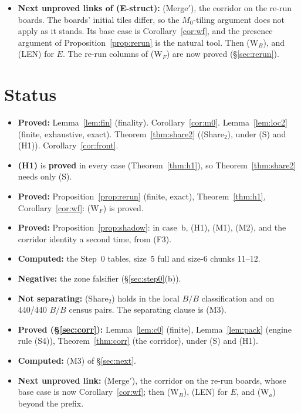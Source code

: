 \documentclass[11pt]{article}
\theoremstyle{definition}\newtheorem{definition}[theorem]{Definition}\newtheorem{remark}[theorem]{Remark}
\begin{document}
\begin{itemize}
(iii) $T_E=C$: for $E_0=(0,a0)$, with $(-1,0)$, and $E_0=(1,b)$, with $(-1,-1)$, the inequality $\le$ holds against every alternative. So nothing follows.
So (H1) in case~a remains open for $T_E=C$ and for $E_0=(0,a1)$.
\item \textbf{Next unproved links of (E-struct):} (Merge$'$), the corridor on the re-run boards. The boards' initial tiles differ, so the $M_0$-tiling argument does not apply as it stands. Its base case is Corollary~\ref{cor:wf}, and the presence argument of Proposition~\ref{prop:rerun} is the natural tool. Then (W$_B$), and (LEN) for $E$. The re-run columns of (W$_F$) are now proved (\S\ref{sec:rerun}).
\end{itemize}

\section*{Status}
\begin{itemize}
\item \textbf{Proved:} Lemma~\ref{lem:fin} (finality). Corollary~\ref{cor:m0}. Lemma~\ref{lem:loc2} (finite, exhaustive, exact). Theorem~\ref{thm:share2} ((Share$_2$), under (S) and (H1)). Corollary~\ref{cor:front}.
\item \textbf{(H1)} is \textbf{proved} in every case (Theorem~\ref{thm:h1}), so Theorem~\ref{thm:share2} needs only (S).
\item \textbf{Proved:} Proposition~\ref{prop:rerun} (finite, exact), Theorem~\ref{thm:h1}, Corollary~\ref{cor:wf}: (W$_F$) is proved.
\item \textbf{Proved:} Proposition~\ref{prop:shadow}: in case~b, (H1), (M1), (M2), and the corridor identity a second time, from (F3).
\item \textbf{Computed:} the Step~0 tables, size~5 full and size-6 chunks 11--12.
\item \textbf{Negative:} the zone falsifier (\S\ref{sec:step0}(b)).
\item \textbf{Not separating:} (Share$_2$) holds in the local $B/B$ classification and on 440/440 $B/B$ census pairs. The separating clause is (M3).
\item \textbf{Proved (\S\ref{sec:corr}):} Lemma~\ref{lem:c0} (finite), Lemma~\ref{lem:pack} (engine rule (S4)), Theorem~\ref{thm:corr} (the corridor), under (S) and (H1).
\item \textbf{Computed:} (M3) of \S\ref{sec:next}.
\item \textbf{Next unproved link:} (Merge$'$), the corridor on the re-run boards, whose base case is now Corollary~\ref{cor:wf}; then (W$_B$), (LEN) for $E$, and (W$_a$) beyond the prefix.
\end{itemize}
\end{document}
